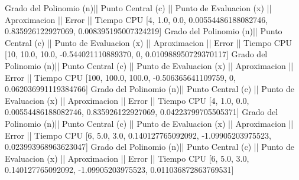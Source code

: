 Grado del Polinomio (n)|| Punto Central (c) || Punto de Evaluacion (x) || Aproximacion || Error || Tiempo CPU 
 [4, 1.0, 0.0, 0.00554486188082746, 0.835926122927069, 0.008395195007324219]
Grado del Polinomio (n)|| Punto Central (c) || Punto de Evaluacion (x) || Aproximacion || Error || Tiempo CPU 
 [10, 10.0, 10.0, -0.544021110889370, 0, 0.010988950729370117]
Grado del Polinomio (n)|| Punto Central (c) || Punto de Evaluacion (x) || Aproximacion || Error || Tiempo CPU 
 [100, 100.0, 100.0, -0.506365641109759, 0, 0.062036991119384766]
Grado del Polinomio (n)|| Punto Central (c) || Punto de Evaluacion (x) || Aproximacion || Error || Tiempo CPU 
 [4, 1.0, 0.0, 0.00554486188082746, 0.835926122927069, 0.04223799705505371]
Grado del Polinomio (n)|| Punto Central (c) || Punto de Evaluacion (x) || Aproximacion || Error || Tiempo CPU 
 [6, 5.0, 3.0, 0.140127765092092, -1.09905203975523, 0.023993968963623047]
Grado del Polinomio (n)|| Punto Central (c) || Punto de Evaluacion (x) || Aproximacion || Error || Tiempo CPU 
 [6, 5.0, 3.0, 0.140127765092092, -1.09905203975523, 0.011036872863769531]
